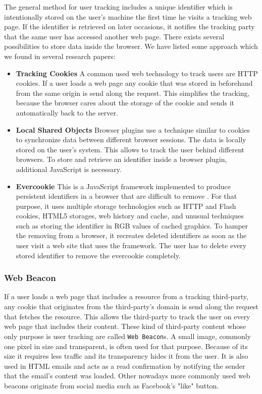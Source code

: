	The general method for user tracking includes a unique identifier which is intentionally stored on the user's machine the first time he visits a tracking web page. If the identifier is retrieved on later occasions, it notifies the tracking party that the same user has accessed another web page. There exists several possibilities to store data inside the browser. We have listed some approach which we found in several research papers:
		
	\begin{itemize}
		\item \textbf{Tracking Cookies} A common used web technology to track users are HTTP cookies. If a user loads a web page any cookie that was stored in beforehand from the same origin is send along the request. This simplifies the tracking, because the browser cares about the storage of the cookie and sends it automatically back to the server.
		
		\item \textbf{Local Shared Objects} Browser plugins use a technique similar to cookies to synchronize data between different browser sessions. The data is locally stored on the user's system. This allows to track the user behind different browsers. To store and retrieve an identifier inside a browser plugin, additional JavaScript is necessary.
		
		\item \textbf{Evercookie} This is a JavaScript framework implemented to produce persistent identifiers in a browser that are difficult to remove \cite{evercookie}. For that purpose, it uses multiple storage technologies such as HTTP and Flash cookies, HTML5 storages, web history and cache, and unusual techniques such as storing the identifier in RGB values of cached graphics. To hamper the removing from a browser, it recreates deleted identifiers as soon as the user visit a web site that uses the framework. The user has to delete every stored identifier to remove the evercookie completely. 
	\end{itemize}
	
\subsubsection{Web Beacon}
\label{sec:webBeacon}
	
	If a user loads a web page that includes a resource from a tracking third-party, any cookie that originates from the third-party's domain is send along the request that fetches the resource. This allows the third-party to track the user on every web page that includes their content. These kind of third-party content whose only purpose is user tracking are called \texttt{Web Beacon}s. A small image, commonly one pixel in size and transparent, is often used for that purpose. Because of its size it requires less traffic and its transparency hides it from the user. It is also used in HTML emails and acts as a read confirmation by notifying the sender that the email's content was loaded. Other nowadays more commonly used web beacons originate from social media such as Facebook's "like" button. 
	
